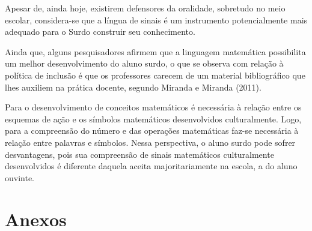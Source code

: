 \documentclass[brasil]{abnt}
\begin{document}
	Apesar de, ainda hoje, existirem defensores da oralidade, sobretudo no meio escolar, considera-se que a língua de sinais é um instrumento potencialmente mais adequado para o Surdo construir seu 
	conhecimento. 	 
	
	Ainda que, alguns pesquisadores afirmem que a linguagem matemática possibilita um melhor desenvolvimento do aluno surdo, o que se observa com relação à política de inclusão é que os professores carecem 
	de um material bibliográfico que lhes auxiliem na prática docente, segundo Miranda e Miranda (2011).
	
	Para o desenvolvimento de conceitos matemáticos é necessária à relação entre os esquemas de ação e os símbolos matemáticos desenvolvidos culturalmente. Logo, para a compreensão do número e das operações 
	matemáticas faz-se necessária à relação entre palavras e símbolos. Nessa perspectiva, o aluno surdo pode sofrer desvantagens, pois sua compreensão de sinais matemáticos culturalmente desenvolvidos é 
	diferente daquela aceita majoritariamente na escola, a do aluno ouvinte.

	
		

  

	\nocite{audi}
	\nocite{aud}
	\nocite{bev}
	\nocite{bot}
	\nocite{capo}
	\nocite{car}
	\nocite{coch}
	\nocite{cou}
	\nocite{dada}
	\nocite{Ubi}
	\nocite{amore}
	\nocite{dec}
	\nocite{fil}
	\nocite{gold}
	\nocite{lacerd}
	\nocite{lip}
	\nocite{machado}
	\nocite{PC}
	\nocite{macha}
	\nocite{martins}
	\nocite{mm}
	\nocite{moraes}
	\nocite{mon}
	\nocite{nogu}
	\nocite{nunes}
	\nocite{Wiki}
	\nocite{oliveira}
	\nocite{Almeida}
	\nocite{Paul}
	\nocite{pei}
	\nocite{crist}
	\nocite{phs}
	\nocite{quas}
	\nocite{qua}
	\nocite{qep}
	\nocite{quads}
	\nocite{sado}
	\nocite{Sales}
	\nocite{san}
	\nocite{coelho}
	\nocite{sp}
	\nocite{ei}
	\nocite{silva}
	\nocite{soares}
	\nocite{sou}
	\nocite{stro}
	\nocite{qes}
	\nocite{vs}
	\nocite{vieira}
    
\chapter*{Anexos}
\end{document}
